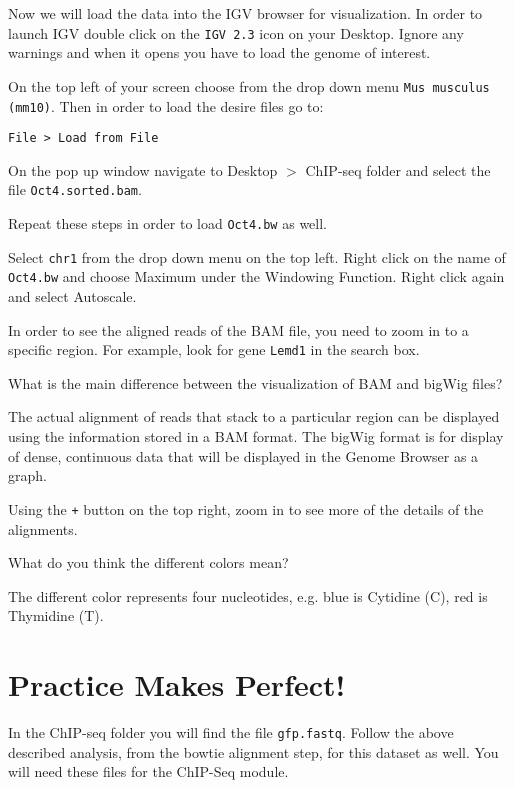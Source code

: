 \begin{steps}
Now we will load the data into the IGV browser for visualization. In order to
launch IGV double click on the \texttt{IGV 2.3} icon on your Desktop. Ignore any warnings
and when it opens you have to load the genome of interest.

On the top left of your screen choose from the drop down menu \texttt{Mus musculus
(mm10)}. Then in order to load the desire files go to:

\begin{lstlisting}[style=command_syntax]
File > Load from File
\end{lstlisting}

On the pop up window navigate to Desktop $>$ ChIP-seq folder and select the file
\texttt{Oct4.sorted.bam}.

Repeat these steps in order to load \texttt{Oct4.bw} as well.

Select \texttt{chr1} from the drop down menu on the top left. Right click on the name of
\texttt{Oct4.bw} and choose Maximum under the Windowing Function. Right click again and
select Autoscale.

In order to see the aligned reads of the BAM file, you need to zoom in to a
specific region. For example, look for gene \texttt{Lemd1} in the search box.
\end{steps}

\begin{questions}
What is the main difference between the visualization of BAM and bigWig files?
\begin{answer}
The actual alignment of reads that stack to a particular region can be displayed
using the information stored in a BAM format.
The bigWig format is for display of dense, continuous data that will be
displayed in the Genome Browser as a graph.
\end{answer}
\end{questions}

Using the \texttt{+} button on the top right, zoom in to see more of the details of the alignments.

\begin{questions}
What do you think the different colors mean?
\begin{answer}
The different color represents four nucleotides, e.g. blue is Cytidine (C), red
is Thymidine (T).
\end{answer}
\end{questions}

\section{Practice Makes Perfect!}
\begin{steps}
In the ChIP-seq folder you will find the file \texttt{gfp.fastq}. Follow the
above described analysis, from the bowtie alignment step, for this dataset as
well. You will need these files for the ChIP-Seq module.
\end{steps}
